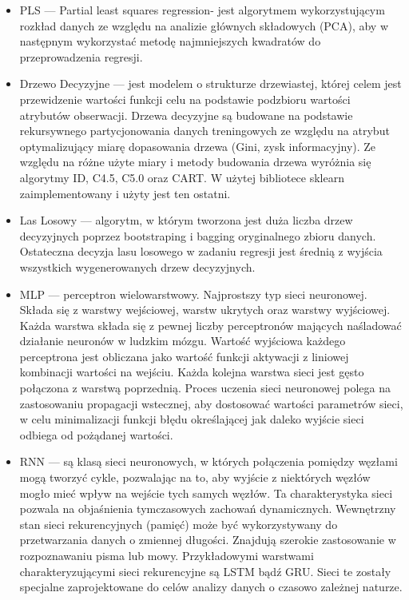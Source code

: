 \begin{itemize}
    \item PLS — Partial least squares regression- jest algorytmem wykorzystującym rozkład
    danych ze względu na analizie głównych składowych (PCA), aby w następnym wykorzystać metodę
    najmniejszych kwadratów do przeprowadzenia regresji.

    \item Drzewo Decyzyjne — jest modelem o strukturze drzewiastej, której celem jest
    przewidzenie wartości funkcji celu na podstawie podzbioru wartości atrybutów obserwacji. 
    Drzewa decyzyjne są budowane na podstawie rekursywnego partycjonowania danych treningowych
    ze względu na atrybut optymalizujący miarę dopasowania drzewa (Gini, zysk informacyjny).
    Ze względu na różne użyte miary i metody budowania drzewa wyróżnia się algorytmy ID, C4.5,
    C5.0 oraz CART. W użytej bibliotece sklearn zaimplementowany i użyty jest ten ostatni.

    \item Las Losowy — algorytm, w którym tworzona jest duża liczba drzew decyzyjnych poprzez
    bootstraping i bagging oryginalnego zbioru danych. Ostateczna decyzja lasu losowego w 
    zadaniu regresji jest średnią z wyjścia wszystkich wygenerowanych drzew decyzyjnych.

    \item MLP — perceptron wielowarstwowy. Najprostszy typ sieci neuronowej. Składa się z 
    warstwy wejściowej, warstw ukrytych oraz warstwy wyjściowej. Każda warstwa składa się
    z pewnej liczby perceptronów mających naśladować działanie neuronów w ludzkim mózgu.
    Wartość wyjściowa każdego perceptrona jest obliczana jako wartość funkcji aktywacji z 
    liniowej kombinacji wartości na wejściu. Każda kolejna warstwa sieci jest gęsto połączona
    z warstwą poprzednią.
    Proces uczenia sieci neuronowej polega na zastosowaniu propagacji wstecznej, aby dostosować
    wartości parametrów sieci, w celu minimalizacji funkcji błędu określającej jak daleko
    wyjście sieci odbiega od pożądanej wartości. 

    \item RNN — są klasą sieci neuronowych, w których połączenia pomiędzy węzłami
    mogą tworzyć cykle, pozwalając na to, aby wyjście z niektórych węzłów mogło mieć wpływ na 
    wejście tych samych węzłów. Ta charakterystyka sieci pozwala na objaśnienia tymczasowych 
    zachowań dynamicznych. Wewnętrzny stan sieci rekurencyjnych (pamięć) może być wykorzystywany
    do przetwarzania danych o zmiennej długości. Znajdują szerokie zastosowanie w rozpoznawaniu
    pisma lub mowy. Przykładowymi warstwami charakteryzującymi sieci rekurencyjne są LSTM bądź GRU.
    Sieci te zostały specjalne zaprojektowane do celów analizy danych o czasowo zależnej naturze.


\end{itemize}
